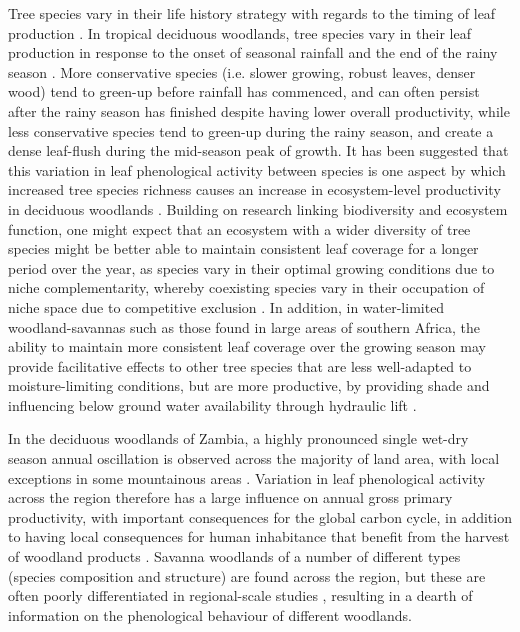 \documentclass[11pt,a4paper]{article}
\begin{document}
Tree species vary in their life history strategy with regards to the timing of leaf production \citep{}. In tropical deciduous woodlands, tree species vary in their leaf production in response to the onset of seasonal rainfall and the end of the rainy season \citep{}. More conservative species (i.e. slower growing, robust leaves, denser wood) tend to green-up before rainfall has commenced, and can often persist after the rainy season has finished despite having lower overall productivity, while less conservative species tend to green-up during the rainy season, and create a dense leaf-flush during the mid-season peak of growth. It has been suggested that this variation in leaf phenological activity between species is one aspect by which increased tree species richness causes an increase in ecosystem-level productivity in deciduous woodlands \citep{}. Building on research linking biodiversity and ecosystem function, one might expect that an ecosystem with a wider diversity of tree species might be better able to maintain consistent leaf coverage for a longer period over the year, as species vary in their optimal growing conditions due to niche complementarity, whereby coexisting species vary in their occupation of niche space due to competitive exclusion \citep{}. In addition, in water-limited woodland-savannas such as those found in large areas of southern Africa, the ability to maintain more consistent leaf coverage over the growing season may provide facilitative effects to other tree species that are less well-adapted to moisture-limiting conditions, but are more productive, by providing shade and influencing below ground water availability through hydraulic lift \citep{}.

In the deciduous woodlands of Zambia, a highly pronounced single wet-dry season annual oscillation is observed across the majority of land area, with local exceptions in some mountainous areas \citep{}. Variation in leaf phenological activity across the region therefore has a large influence on annual gross primary productivity, with important consequences for the global carbon cycle, in addition to having local consequences for human inhabitance that benefit from the harvest of woodland products \citep{}. Savanna woodlands of a number of different types (species composition and structure) are found across the region, but these are often poorly differentiated in regional-scale studies \citep{}, resulting in a dearth of information on the phenological behaviour of different woodlands.
\end{document}
